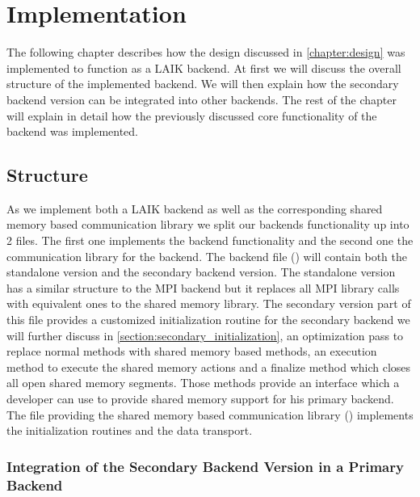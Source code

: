 
\chapter{Implementation}\label{chapter:implementation}

The following chapter describes how the design discussed in \autoref{chapter:design} was implemented to function as a LAIK backend.
At first we will discuss the overall structure of the implemented backend.
We will then explain how the secondary backend version can be integrated into other backends.
The rest of the chapter will explain in detail how the previously discussed core functionality of the backend was implemented.

\section{Structure}

As we implement both a LAIK backend as well as the corresponding shared memory based communication library we split our backends functionality up into 2 files.
The first one implements the backend functionality and the second one the communication library for the backend.
The backend file () will contain both the standalone version and the secondary backend version.
The standalone version has a similar structure to the MPI backend but it replaces all MPI library calls with equivalent ones to the shared memory library.
The secondary version part of this file provides a customized initialization routine for the secondary backend we will further discuss in \autoref{section:secondary_initialization}, an optimization pass to replace normal methods with shared memory based methods, an execution method to execute the shared memory actions and a finalize method which closes all open shared memory segments.
Those methods provide an interface which a developer can use to provide shared memory support for his primary backend.
The file providing the shared memory based communication library () implements the initialization routines and the data transport.

\subsection{Integration of the Secondary Backend Version in a Primary Backend}\label{section:integration}

